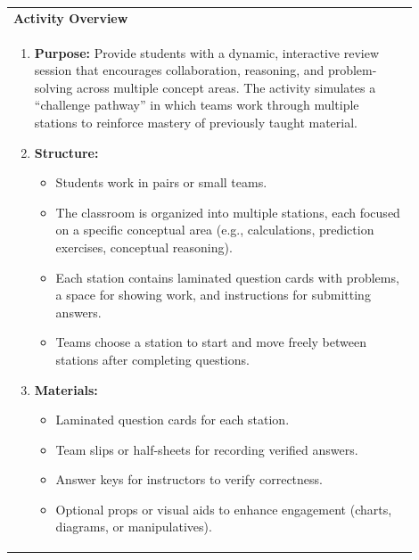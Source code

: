 \documentclass{article}
\begin{document}
\newpage
\noindent
\begin{tabular}{|p{0.9\linewidth}|}
\hline
{\large\textbf{Activity Overview}} \\
\begin{enumerate}
    \item \textbf{Purpose:} Provide students with a dynamic, interactive review session that encourages collaboration, reasoning, and problem-solving across multiple concept areas. The activity simulates a “challenge pathway” in which teams work through multiple stations to reinforce mastery of previously taught material.
    
    \item \textbf{Structure:} 
    \begin{itemize}
        \item Students work in pairs or small teams.
        \item The classroom is organized into multiple stations, each focused on a specific conceptual area (e.g., calculations, prediction exercises, conceptual reasoning).
        \item Each station contains laminated question cards with problems, a space for showing work, and instructions for submitting answers.
        \item Teams choose a station to start and move freely between stations after completing questions.
    \end{itemize}
    
    \item \textbf{Materials:} 
    \begin{itemize}
        \item Laminated question cards for each station.
        \item Team slips or half-sheets for recording verified answers.
        \item Answer keys for instructors to verify correctness.
        \item Optional props or visual aids to enhance engagement (charts, diagrams, or manipulatives).
    \end{itemize}
\end{enumerate} \\
\hline
\end{tabular}
\newpage
\end{document}
